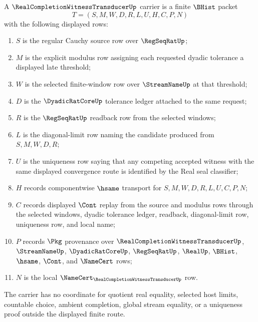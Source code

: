 \begin{definition}
\label{def:real-completion-witness-transducer-carrier}
A $\RealCompletionWitnessTransducerUp$ carrier is a finite $\BHist$ packet
$$
T=(S,M,W,D,R,L,U,H,C,P,N)
$$
with the following displayed rows:
\begin{enumerate}
\item $S$ is the regular Cauchy source row over $\RegSeqRatUp$;
\item $M$ is the explicit modulus row assigning each requested dyadic tolerance a displayed late threshold;
\item $W$ is the selected finite-window row over $\StreamNameUp$ at that threshold;
\item $D$ is the $\DyadicRatCoreUp$ tolerance ledger attached to the same request;
\item $R$ is the $\RegSeqRatUp$ readback row from the selected windows;
\item $L$ is the diagonal-limit row naming the candidate produced from $S,M,W,D,R$;
\item $U$ is the uniqueness row saying that any competing accepted witness with the same displayed convergence route is identified by the Real seal classifier;
\item $H$ records componentwise $\hsame$ transport for $S,M,W,D,R,L,U,C,P,N$;
\item $C$ records displayed $\Cont$ replay from the source and modulus rows through the selected windows, dyadic tolerance ledger, readback, diagonal-limit row, uniqueness row, and local name;
\item $P$ records $\Pkg$ provenance over $\RealCompletionWitnessTransducerUp$, $\StreamNameUp$, $\DyadicRatCoreUp$, $\RegSeqRatUp$, $\RealUp$, $\BHist$, $\hsame$, $\Cont$, and $\NameCert$ rows;
\item $N$ is the local $\NameCert_{\RealCompletionWitnessTransducerUp}$ row.
\end{enumerate}
The carrier has no coordinate for quotient real equality, selected host limits, countable choice, ambient completion, global stream equality, or a uniqueness proof outside the displayed finite route.
\end{definition}

